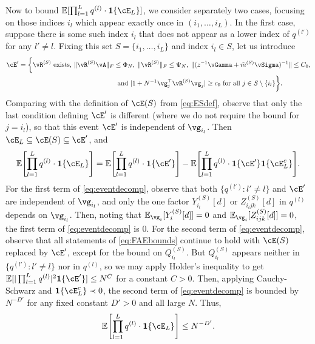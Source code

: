 \begin{proof-of-lemma}[\ref{lemma:fluctuationavg}]
Now to bound $\E[\prod_{l=1}^L q^{(l)} \cdot \bI\{\cE_L\}]$,
we consider separately two cases, focusing on those indices $i_l$ which
appear exactly once in $(i_1,\ldots,i_L)$.
In the first case, suppose there is some such index $i_l$ that does not appear
as a lower index of $q^{(l')}$ for any $l' \neq l$. Fixing this set
$S=\{i_1,\ldots,i_L\}$ and index $i_l \in S$, let us introduce
\begin{align*}
\cE'&=\bigg\{\vR^{(S)} \text{ exists, } \|\vR^{(S)}\vA\|_F \leq \Phi_N,\;
\|\vR^{(S)}\|_F \leq \Psi_N,\;
\|(z^{-1}\vGamma+\tilde m^{(S)} \vSigma)^{-1}\| \leq C_0,\\
&\hspace{2in} \text{ and }
|1+N^{-1} \vg_j^\top \vR^{(S)}\vg_j| \geq c_0 \text{ for all } j \in S \setminus
\{i_l\} \bigg\}.
\end{align*}
Comparing
with the definition of $\cE(S)$ from \eqref{eq:ESdef}, observe that
only the last condition defining $\cE'$ is different (where we do not require
the bound for $j=i_l$), so that this event $\cE'$ is independent of $\vg_{i_l}$.
Then $\cE_L \subseteq \cE(S) \subseteq \cE'$, and
\begin{equation}\label{eq:eventdecomp}
\E\left[\prod_{l=1}^L q^{(l)} \cdot \bI\{\cE_L\}\right]
=\E\left[\prod_{l=1}^L q^{(l)} \cdot \bI\{\cE'\}\right]
-\E\left[\prod_{l=1}^L q^{(l)} \cdot \bI\{\cE'\}\bI\{\cE_L^c\}
\right].
\end{equation}
For the first term of \eqref{eq:eventdecomp}, observe that
both $\{q^{(l')}:l' \neq l\}$ and $\cE'$ are independent of
$\vg_{i_l}$, and only the one
factor $Y_{i_l}^{(S)}[d]$ or $Z_{i_ljk}^{(S)}[d]$ in $q^{(l)}$ depends on
$\vg_{i_l}$. Then, noting that $\E_{\vg_i}[Y_i^{(S)}[d]]=0$ and
$\E_{\vg_i}[Z_{ijk}^{(S)}[d]]=0$, the first term of \eqref{eq:eventdecomp}
is 0. For the second term of \eqref{eq:eventdecomp},
observe that all statements of \eqref{eq:FAEbounds} continue to hold with
$\cE(S)$ replaced by $\cE'$, except for the bound on $Q_{i_l}^{(S)}$.
But $Q_{i_l}^{(S)}$ appears neither in
$\{q^{(l')}:l' \neq l\}$ nor in $q^{(l)}$, so we may apply Holder's inequality
to get $\E[|\prod_{l=1}^L q^{(l)}|^2 \bI\{\cE'\}] \leq N^C$ for a constant
$C>0$. Then, applying Cauchy-Schwarz and $\bI\{\cE_L^c\} \prec 0$, the second
term of \eqref{eq:eventdecomp} is bounded by $N^{-D'}$ for any fixed constant
$D'>0$ and all large $N$. Thus,
\begin{equation}\label{eq:FAcase1}
\E\left[\prod_{l=1}^L q^{(l)} \cdot \bI\{\cE_L\}\right] \leq N^{-D'}.
\end{equation}


\end{proof-of-lemma}
